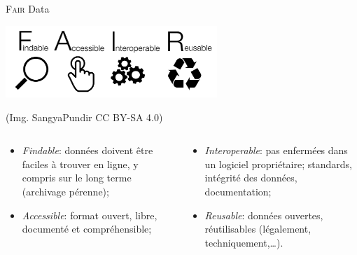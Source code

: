 \documentclass[ignorenonframetext]{beamer}
\begin{document}
\begin{frame}{\textsc{Fair} Data}
\begin{center}
	\includegraphics[width=0.6\textwidth]{img/FAIR_data_principles.jpg}
	
	{\footnotesize (Img. SangyaPundir CC BY-SA 4.0)}%
\end{center}

\begin{columns}[T]
	\begin{column}{0.5\textwidth}
		\begin{itemize}
			\item \textit{Findable}: données doivent être faciles à trouver en ligne, y compris sur le long terme (archivage pérenne);%
			\item \textit{Accessible}: format ouvert, libre, documenté et compréhensible;
		\end{itemize}
	\end{column}
	\begin{column}{0.5\textwidth}
		\begin{itemize}
			\item \textit{Interoperable}: pas enfermées dans un logiciel propriétaire; standards, intégrité des données, documentation;
			\item \textit{Reusable}: données ouvertes, réutilisables  (légalement, techniquement,…).
		\end{itemize}
	\end{column}
\end{columns}


\end{frame}

\end{document}
